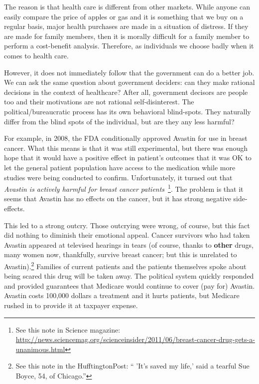 The reason is that health care is different from other markets. While anyone
can easily compare the price of apples or gas and it is something that we buy
on a regular basis, major health purchases are made in a situation of distress.
If they are made for family members, then it is morally difficult for a family
member to perform a cost-benefit analysis. Therefore, as individuals we choose
badly when it comes to health care.

However, it does not immediately follow that the government can do a better
job. We can ask the same question about government deciders: can they make
rational decisions in the context of healthcare? After all, government decisors
are people too and their motivations are not rational self-disinterest. The
political/bureaucratic process has its own behavioral blind-spots. They
naturally differ from the blind spots of the individual, but are they any less
harmful?

For example, in 2008, the FDA conditionally approved Avastin for use in breast
cancer. What this means is that it was still experimental, but there was enough
hope that it would have a positive effect in patient's outcomes that it was OK
to let the general patient population have access to the medication while more
studies were being conducted to confirm. Unfortunately, it turned out that
\emph{Avastin is actively harmful for breast cancer
patients}~\cite{avastin-harfmul}\footnote{See this note in Science magazine:
\url{http://news.sciencemag.org/scienceinsider/2011/06/breast-cancer-drug-gets-a-unanimous.html}}.
The problem is that it seems that Avastin has no effects on the cancer, but it
has strong negative side-effects.

This led to a strong outcry. Those outcrying were wrong, of course, but this
fact did nothing to diminish their emotional appeal. Cancer survivors who had
taken Avastin appeared at televised hearings in tears (of course, thanks to
\textbf{other} drugs, many women now, thankfully, survive breast cancer; but
this is unrelated to Avastin).\footnote{See this note in the HufftingtonPost:
`` 'It's saved my life,' said a tearful Sue Boyce, 54, of Chicago.''}
Families of current patients and the patients themselves spoke about being
scared this drug will be taken away. The political system quickly responded and
provided guarantees that Medicare would continue to cover (pay for) Avastin.
Avastin costs 100,000 dollars a treatment and it hurts patients, but Medicare
rushed in to provide it at taxpayer expense.

